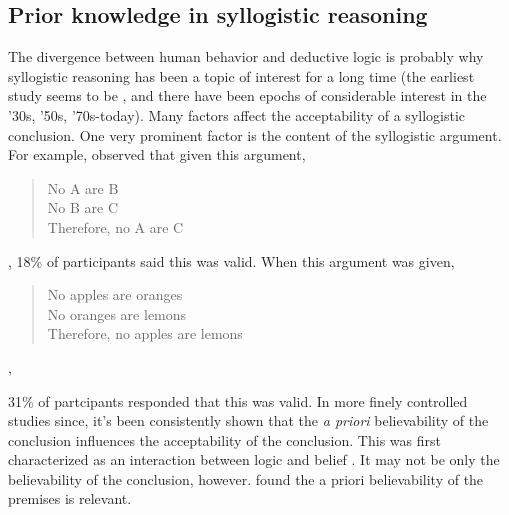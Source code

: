 \documentclass{llncs} %
\begin{document}
\subsection{Prior knowledge in syllogistic reasoning}

The divergence between human behavior and deductive logic is probably why syllogistic reasoning has been a topic of interest for a long time (the earliest study seems to be , and there have been epochs of considerable interest in the '30s, '50s, '70s-today). Many factors affect the acceptability of a syllogistic conclusion. One very prominent factor is the content of the syllogistic argument. For example,  observed that given this argument,

\begin{quote}
No A are B\\
No B are C\\
Therefore, no A are C
\end{quote}

, 18\% of participants said this was valid. When this argument was given,

\begin{quote}
No apples are oranges\\
No oranges are lemons\\
Therefore, no apples are lemons
\end{quote},

31\% of partcipants responded that this was valid. In more finely controlled studies since, it's been consistently shown that the \emph{a priori} believability of the conclusion influences the acceptability of the conclusion. This was first characterized as an interaction between logic and belief \cite{Evans1983}. It may not be only the believability of the conclusion, however.  found the a priori believability of the premises is relevant. 

\end{document}
